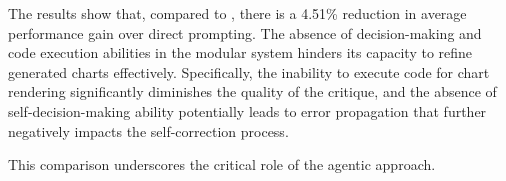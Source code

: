 The results show that, compared to \model{}, there is a 4.51\% reduction in average performance gain over direct prompting. The absence of decision-making and code execution abilities in the modular system hinders its capacity to refine generated charts effectively. Specifically, the inability to execute code for chart rendering significantly diminishes the quality of the critique, and the absence of self-decision-making ability potentially leads to error propagation that further negatively impacts the self-correction process.

This comparison underscores the critical role of the agentic approach.

